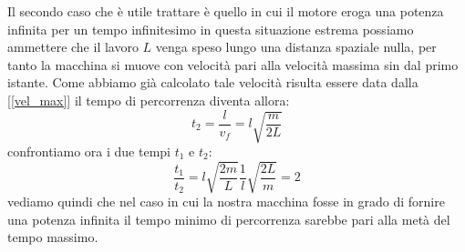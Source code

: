 \documentclass[a4paper,10pt,oneside]{article}
\begin{document}
Il secondo caso che è utile trattare è quello in cui il motore eroga una potenza infinita per un tempo infinitesimo in questa situazione estrema possiamo ammettere che il lavoro $L$ venga speso lungo una distanza spaziale nulla, per tanto la macchina si muove con velocità pari alla velocità massima sin dal primo istante. Come abbiamo già calcolato tale velocità risulta essere data dalla [\ref{vel_max}] il tempo di percorrenza diventa allora:
\begin{equation}
 t_2=\frac{l}{v_f}=l\sqrt{\frac{m}{2L}}
\end{equation}
confrontiamo ora i due tempi $t_1$ e $t_2$:
\begin{equation}
 \frac{t_1}{t_2}=l\sqrt{\frac{2m}{L}}\frac{1}{l}\sqrt{\frac{2L}{m}}=2
\end{equation}
vediamo quindi che nel caso in cui la nostra macchina fosse in grado di fornire una potenza infinita il tempo minimo di percorrenza sarebbe pari alla metà del tempo massimo.
\end{document}
